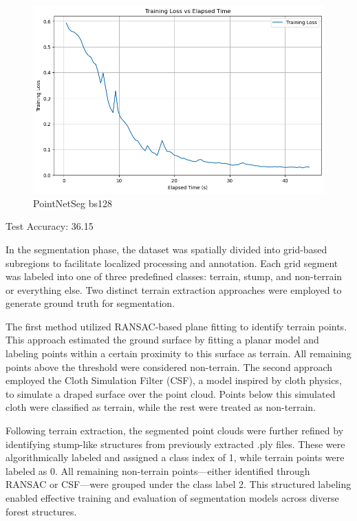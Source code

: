 \documentclass[../report.tex]{subfiles}
\begin{document}
\begin{figure}
    \centering
    \includegraphics[width=0.7\linewidth]{rnd-project-report-main/figures/PointNetSeg_bs128.png}
    \caption{PointNetSeg bs128}
    \label{fig:enter-label}
\end{figure}
Test Accuracy: 36.15%

In the segmentation phase, the dataset was spatially divided into grid-based subregions to facilitate localized processing and annotation. Each grid segment was labeled into one of three predefined classes: terrain, stump, and non-terrain or everything else. Two distinct terrain extraction approaches were employed to generate ground truth for segmentation.

The first method utilized RANSAC-based plane fitting to identify terrain points. This approach estimated the ground surface by fitting a planar model and labeling points within a certain proximity to this surface as terrain. All remaining points above the threshold were considered non-terrain. The second approach employed the Cloth Simulation Filter (CSF), a model inspired by cloth physics, to simulate a draped surface over the point cloud. Points below this simulated cloth were classified as terrain, while the rest were treated as non-terrain.

Following terrain extraction, the segmented point clouds were further refined by identifying stump-like structures from previously extracted .ply files. These were algorithmically labeled and assigned a class index of 1, while terrain points were labeled as 0. All remaining non-terrain points—either identified through RANSAC or CSF—were grouped under the class label 2. This structured labeling enabled effective training and evaluation of segmentation models across diverse forest structures.
\end{document}
